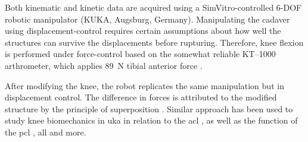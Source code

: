 Both kinematic and kinetic data are acquired using a SimVitro-controlled 6-DOF robotic manipulator (KUKA, Augsburg, Germany).
Manipulating the cadaver using displacement-control requires certain assumptions about how well the structures can survive the displacements before rupturing. 
Therefore, knee flexion is performed under force-control based on the somewhat reliable KT--1000 arthrometer, which applies \SI{89}{\newton} tibial anterior force \cite{wiertsema_reliability_2008}.

After modifying the knee, the robot replicates the same manipulation but in displacement control.
The difference in forces is attributed to the modified structure by the principle of superposition \cite{hoher_situ_1999}.
Similar approach has been used to study knee biomechanics in \gls{uka} in relation to the \gls{acl} \cite{suggs_knee_2006}, as well as the function of the \gls{pcl} \cite{hoher_situ_1999}, \gls{all} \cite{parsons_biomechanical_2015} and more.
